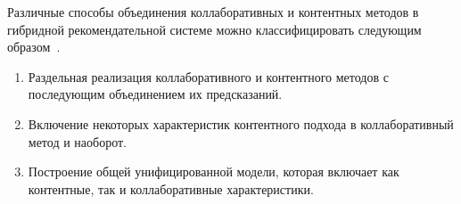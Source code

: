 Различные способы объединения коллаборативных и контентных методов в
гибридной рекомендательной системе можно классифицировать следующим образом~\cite{hist}.

\begin{enumerate}
\item Раздельная реализация коллаборативного и контентного методов с последующим объединением их предсказаний.
\item Включение некоторых характеристик контентного подхода в коллаборативный метод и наоборот.
\item Построение общей унифицированной модели, которая включает как контентные, так и коллаборативные характеристики.
\end{enumerate}



